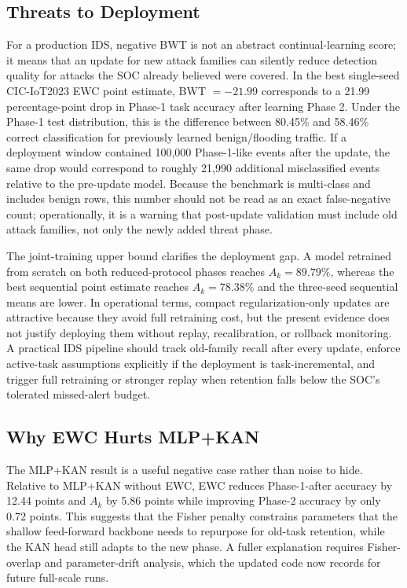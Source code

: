 \documentclass[a4paper,fleqn]{cas-dc}
\begin{document}
\subsection{Threats to Deployment}
For a production IDS, negative BWT is not an abstract continual-learning score; it means that an update for new attack families can silently reduce detection quality for attacks the SOC already believed were covered. In the best single-seed CIC-IoT2023 EWC point estimate, BWT $=-21.99$ corresponds to a 21.99 percentage-point drop in Phase-1 task accuracy after learning Phase 2. Under the Phase-1 test distribution, this is the difference between 80.45\% and 58.46\% correct classification for previously learned benign/flooding traffic. If a deployment window contained 100,000 Phase-1-like events after the update, the same drop would correspond to roughly 21,990 additional misclassified events relative to the pre-update model. Because the benchmark is multi-class and includes benign rows, this number should not be read as an exact false-negative count; operationally, it is a warning that post-update validation must include old attack families, not only the newly added threat phase.

The joint-training upper bound clarifies the deployment gap. A model retrained from scratch on both reduced-protocol phases reaches $A_k=89.79\%$, whereas the best sequential point estimate reaches $A_k=78.38\%$ and the three-seed sequential means are lower. In operational terms, compact regularization-only updates are attractive because they avoid full retraining cost, but the present evidence does not justify deploying them without replay, recalibration, or rollback monitoring. A practical IDS pipeline should track old-family recall after every update, enforce active-task assumptions explicitly if the deployment is task-incremental, and trigger full retraining or stronger replay when retention falls below the SOC's tolerated missed-alert budget.

\subsection{Why EWC Hurts MLP+KAN}
The MLP+KAN result is a useful negative case rather than noise to hide. Relative to MLP+KAN without EWC, EWC reduces Phase-1-after accuracy by 12.44 points and $A_k$ by 5.86 points while improving Phase-2 accuracy by only 0.72 points. This suggests that the Fisher penalty constrains parameters that the shallow feed-forward backbone needs to repurpose for old-task retention, while the KAN head still adapts to the new phase. A fuller explanation requires Fisher-overlap and parameter-drift analysis, which the updated code now records for future full-scale runs.
\end{document}
